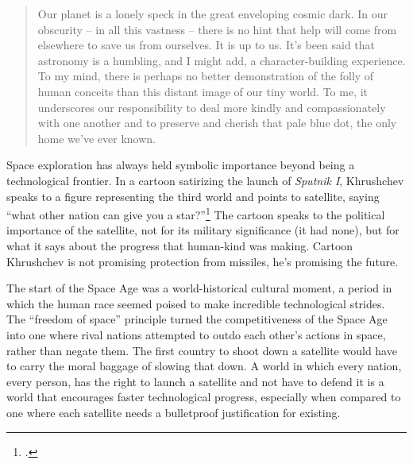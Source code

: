 \documentclass{memoir}
\begin{document}
\begin{quote}
Our planet is a lonely speck in the great enveloping cosmic dark. In our obscurity – in all this vastness – there is no hint that help will come from elsewhere to save us from ourselves. It is up to us. It's been said that astronomy is a humbling, and I might add, a character-building experience. To my mind, there is perhaps no better demonstration of the folly of human conceits than this distant image of our tiny world. To me, it underscores our responsibility to deal more kindly and compassionately with one another and to preserve and cherish that pale blue dot, the only home we've ever known.
\end{quote}

Space exploration has always held symbolic importance beyond being a technological frontier. In a cartoon satirizing the launch of \emph{Sputnik I}, Khrushchev speaks to a figure representing the third world and points to satellite, saying ``what other nation can give you a star?''\footcite{mcdougall_heavens_1985} The cartoon speaks to the political importance of the satellite, not for its military significance (it had none), but for what it says about the progress that human-kind was making. Cartoon Khrushchev is not promising protection from missiles, he's promising the future.

The start of the Space Age was a world-historical cultural moment, a period in which the human race seemed poised to make incredible technological strides. The ``freedom of space'' principle turned the competitiveness of the Space Age into one where rival nations attempted to outdo each other's actions in space, rather than negate them. The first country to shoot down a satellite would have to carry the moral baggage of slowing that down. A world in which every nation, every person, has the right to launch a satellite and not have to defend it is a world that encourages faster technological progress, especially when compared to one where each satellite needs a bulletproof justification for existing.
\newpage
\printbibliography[heading=subbibliography]
\end{document}
